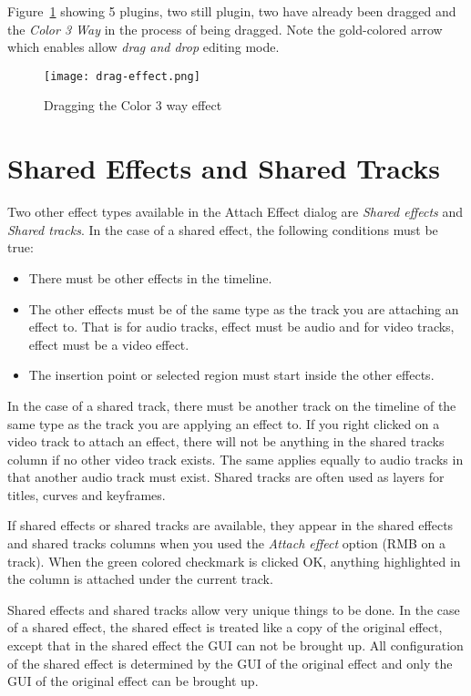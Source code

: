 Figure~\ref{fig:drag-effect} showing 5 plugins, two still plugin, two have already been dragged and the \textit{Color 3 Way} in the process of being dragged. Note the gold-colored arrow which enables allow \textit{drag and drop} editing mode.

\begin{figure}[htpb]
    \centering
    \texttt{[image: drag-effect.png]}
    \caption{Dragging the Color 3 way effect}
    \label{fig:drag-effect}
\end{figure}

\section{Shared Effects and Shared Tracks}%
\label{sec:shared_effect_tracks}

Two other effect types available in the Attach Effect dialog are \textit{Shared effects} and \textit{Shared tracks}. In the case of a shared effect, the following conditions must be true:

\begin{itemize}[noitemsep]
    \item There must be other effects in the timeline.
    \item The other effects must be of the same type as the track you are attaching an effect to. That is for audio tracks, effect must be audio and for video tracks, effect must be a video effect.
    \item The insertion point or selected region must start inside the other effects.
\end{itemize}

In the case of a shared track, there must be another track on the timeline of the same type as the track you are applying an effect to. If you right clicked on a video track to attach an effect, there will not be anything in the shared tracks column if no other video track exists. The same applies equally to audio tracks in that another audio track must exist. Shared tracks are often used as layers for titles, curves and keyframes.

If shared effects or shared tracks are available, they appear in the shared effects and shared tracks columns when you used the \textit{Attach effect} option (RMB on a track). When the green colored checkmark is clicked OK, anything highlighted in the column is attached under the current track.

Shared effects and shared tracks allow very unique things to be done. In the case of a shared effect, the shared effect is treated like a copy of the original effect, except that in the shared effect the GUI can not be brought up. All configuration of the shared effect is determined by the GUI of the original effect and only the GUI of the original effect can be brought up.

